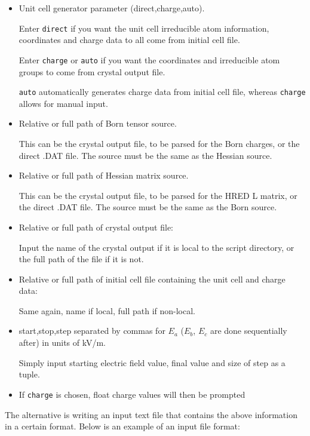 \begin{itemize}
	\item Unit cell generator parameter (direct,charge,auto).
	
	Enter \texttt{direct} if you want the unit cell irreducible atom information, coordinates and charge data to all come from initial cell file.
	
	Enter \texttt{charge} or \texttt{auto} if you want the coordinates and irreducible atom groups to come from crystal output file.
	
	\texttt{auto} automatically generates charge data from initial cell file, whereas \texttt{charge} allows for manual input.
	
	\item Relative or full path of Born tensor source.
	
	This can be the crystal output file, to be parsed for the Born charges, or the direct .DAT file. The source must be the same as the Hessian source.
	
	\item Relative or full path of Hessian matrix source.
	
	This can be the crystal output file, to be parsed for the HRED L matrix, or the direct .DAT file. The source must be the same as the Born source.
	
	\item Relative or full path of crystal output file:
	
	Input the name of the crystal output if it is local to the script directory, or the full path of the file if it is not.
	
	\item Relative or full path of initial cell file containing the unit cell and charge data:
	
	Same again, name if local, full path if non-local.
	
	\item start,stop,step separated by commas for $E_a$ ($E_b$, $E_c$ are done sequentially after) in units of kV/m.
	
	Simply input starting electric field value, final value and size of step as a tuple.
	
	\item If \texttt{charge} is chosen, float charge values will then be prompted
\end{itemize}

The alternative is writing an input text file that contains the above information in a certain format. Below is an example of an input file format:


